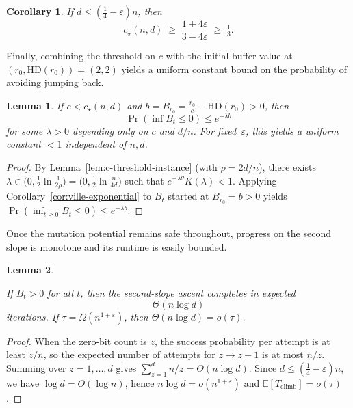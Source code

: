 \documentclass[lettersize,journal]{IEEEtran}
\newcommand{\EE}{\mathbb{E}}
\newtheorem{corollary}{Corollary}
\newtheorem{lemma}{Lemma}
\begin{document}
{\begin{corollary}If $d\le (\tfrac14-\varepsilon)n$, then
	\[
	c_\star(n,d) \;\ge\; \frac{1+4\varepsilon}{3-4\varepsilon} \;\ge\; \tfrac13.
	\]
\end{corollary}
\label{cor:c-floor}



Finally, combining the threshold on $c$ with the initial buffer value at 
$(r_0,\mathrm{HD}(r_0))=(2,2)$ yields a uniform constant bound on the 
probability of avoiding jumping back.

\begin{lemma}
\label{lem:param-constant-c-general}
	If $c<c_\star(n,d)$ and 
	$b=B_{r_0}=\frac{r_0}{c}-\mathrm{HD}(r_0)>0$, 
	then 
	\[
	\Pr\!\left(\inf B_t \le 0\right) \le e^{-\lambda b}
	\]
	for some $\lambda>0$ depending only on $c$ and $d/n$.  
	For fixed~$\varepsilon$, this yields a uniform constant $<1$ independent of 
	$n,d$.
\end{lemma}

\begin{proof}
	By Lemma~\ref{lem:c-threshold-instance} (with $\rho=2d/n$), there exists
	$\lambda\in\big(0,\tfrac12\ln\tfrac{1}{2\rho}\big)=\big(0,\tfrac12\ln\tfrac{n}{4d}\big)$
	such that $e^{-\lambda\theta}K(\lambda)<1$. Applying Corollary~\ref{cor:ville-exponential}
	to $B_t$ started at $B_{r_0}=b>0$ yields
	$\Pr(\inf_{t\ge 0} B_t\le 0)\le e^{-\lambda b}$.
\end{proof}

Once the mutation potential remains safe throughout, progress on the second 
slope is monotone and its runtime is easily bounded.



\begin{lemma}\label{prop:climb-time}
	
	If $B_t>0$ for all $t$, then the second-slope ascent completes in expected
	\[
	\Theta(n\log d)
	\]
	iterations.  
	If $\tau=\Omega(n^{1+\varepsilon})$, then $\Theta(n\log d)=o(\tau)$.
\end{lemma}

\begin{proof}
	When the zero-bit count is $z$, the success probability per attempt is at least $z/n$, so the expected number of attempts for $z\!\to\! z-1$ is at most $n/z$.
	Summing over $z=1,\dots,d$ gives $\sum_{z=1}^{d}n/z=\Theta(n\log d)$.
	Since $d\le(\tfrac14-\varepsilon)n$, we have $\log d=O(\log n)$, hence $n\log d=o(n^{1+\varepsilon})$ and $\EE[T_{\mathrm{climb}}]=o(\tau)$.
\end{proof}


}
\end{document}
